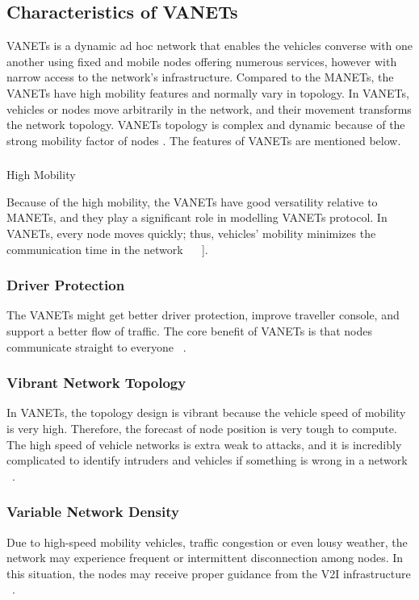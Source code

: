 \documentclass[
  oneside,
  11pt, a4paper,
  footinclude=true,
  headinclude=true,
  cleardoublepage=empty
]{scrbook}
\begin{document}
\subsection{Characteristics of VANETs}
VANETs is a dynamic ad hoc network that enables the vehicles converse with one another using fixed and mobile nodes offering numerous services, however with narrow access to the network’s infrastructure. Compared to the MANETs, the VANETs have high mobility features and normally vary in topology. In VANETs, vehicles or nodes move arbitrarily in the network, and their movement transforms the network topology. VANETs topology is complex and dynamic because of the strong mobility factor of nodes . The features of VANETs are mentioned below.

\subsubsection{}{High Mobility}

Because of the high mobility, the VANETs have good versatility relative to MANETs, and they play a significant role in modelling VANETs protocol. In VANETs, every node moves quickly; thus, vehicles’ mobility minimizes the communication time in the network ~\cite{vanet2} ~\cite{vanet2}].

\subsubsection{Driver Protection}

The VANETs might get better driver protection, improve traveller console, and support a better flow of traffic. The core benefit of VANETs is that nodes communicate straight to everyone ~\cite{vanet2}.

\subsubsection{Vibrant Network Topology}
In VANETs, the topology design is vibrant because the vehicle speed of mobility is very high. Therefore, the forecast of node position is very tough to compute. The high speed of vehicle networks is extra weak to attacks, and it is incredibly complicated to identify intruders and vehicles if something is wrong in a network ~\cite{vanet2}.

\subsubsection{Variable Network Density}
Due to high-speed mobility vehicles, traffic congestion or even lousy weather, the network may experience frequent or intermittent disconnection among nodes. In this situation, the nodes may receive proper guidance from the V2I infrastructure ~\cite{vanet2}.
\end{document}

